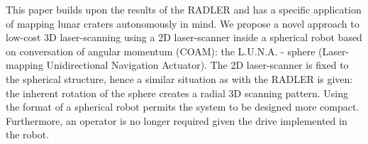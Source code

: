 This paper builds upon the results of the RADLER and has a specific application of mapping lunar craters autonomously in mind. We propose a novel approach to low-cost 3D laser-scanning using a 2D laser-scanner inside a spherical robot based on conversation of angular momentum (COAM): the L.U.N.A. - sphere (Laser-mapping Unidirectional Navigation Actuator). The 2D laser-scanner is fixed to the spherical structure, hence a similar situation as with the RADLER is given: the inherent rotation of the sphere creates a radial 3D scanning pattern. Using the format of a spherical robot permits the system to be designed more compact. Furthermore, an operator is no longer required given the drive implemented in the robot.
